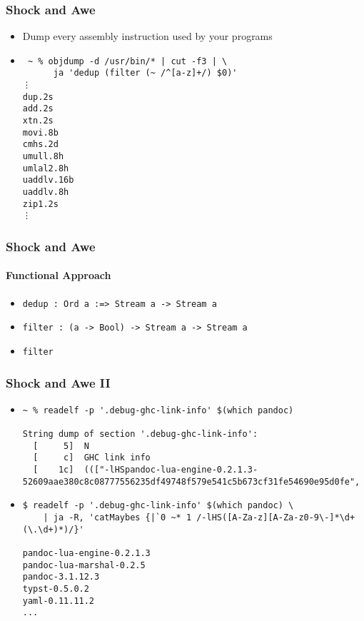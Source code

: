 \documentclass{beamer}
\begin{document}
\begin{frame}[fragile]
  \frametitle{Shock and Awe}
  \begin{itemize}
    \item Dump every assembly instruction used by your programs
    \item
      \begin{verbatim}
 ~ % objdump -d /usr/bin/* | cut -f3 | \
      ja 'dedup (filter (~ /^[a-z]+/) $0)'
⋮
dup.2s
add.2s
xtn.2s
movi.8b
cmhs.2d
umull.8h
umlal2.8h
uaddlv.16b
uaddlv.8h
zip1.2s
⋮
      \end{verbatim}
  \end{itemize}
\end{frame}

\begin{frame}[fragile]
  \frametitle{Shock and Awe}
  \framesubtitle{Functional Approach}
  \begin{itemize}
    \item \verb|dedup : Ord a :=> Stream a -> Stream a|
    \item \verb|filter : (a -> Bool) -> Stream a -> Stream a|
    \item \verb|filter| 
  \end{itemize}
\end{frame}

\begin{frame}[fragile]
  \frametitle{Shock and Awe II}
  \begin{itemize}
    \item
      \begin{verbatim}
~ % readelf -p '.debug-ghc-link-info' $(which pandoc)

String dump of section '.debug-ghc-link-info':
  [     5]  N
  [     c]  GHC link info
  [    1c]  ((["-lHSpandoc-lua-engine-0.2.1.3-52609aae380c8c08777556235df49748f579e541c5b673cf31fe54690e95d0fe",
      \end{verbatim}
    \item
      \begin{verbatim}
$ readelf -p '.debug-ghc-link-info' $(which pandoc) \
    | ja -R, 'catMaybes {|`0 ~* 1 /-lHS([A-Za-z][A-Za-z0-9\-]*\d+(\.\d+)*)/}'

pandoc-lua-engine-0.2.1.3
pandoc-lua-marshal-0.2.5
pandoc-3.1.12.3
typst-0.5.0.2
yaml-0.11.11.2
...
      \end{verbatim}
  \end{itemize}
\end{frame}
\end{document}
